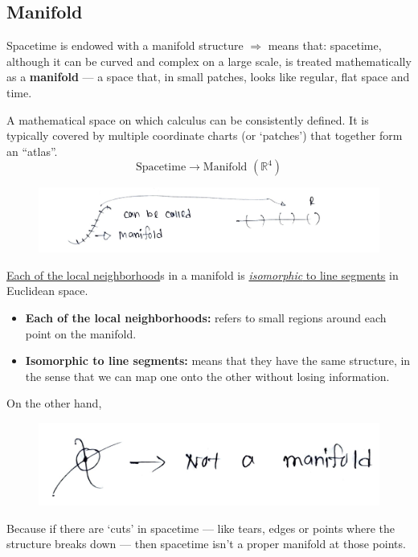 \documentclass[14pt]{article} %
\begin{document}
\subsection{Manifold}
Spacetime is endowed with a manifold structure $\Rightarrow$ means that: spacetime, although it can be curved and complex on a large scale, is treated mathematically as a \textbf{manifold} — a space that, in small patches, looks like regular, flat space and time.
\begin{tcolorbox}[ title=\textbf{Definition}]
A mathematical space on which calculus can be consistently defined. It is typically covered by multiple coordinate charts (or `patches') that together form an ``atlas''.
\[
\text{Spacetime} \rightarrow \text{Manifold } (\mathbb{R}^4)
\]
\end{tcolorbox}
\vspace{-0.5cm}
\begin{figure}[H]
\centering
\includegraphics[width=0.9\linewidth]{L(-1)_1.jpg}
\caption*{}
\end{figure}
\vspace{-0.9cm}
\noindent
\underline{Each of the local neighborhood}s in a manifold is \underline{\textit{isomorphic} to line segments} in Euclidean space.
\begin{itemize}
  \item \textbf{Each of the local neighborhoods:} refers to small regions around each point on the manifold.
  \item \textbf{Isomorphic to line segments:} means that they have the same structure, in the sense that we can map one onto the other without losing information.
\end{itemize}
On the other hand,
\begin{figure}[H]
\centering
\includegraphics[width=0.5\linewidth]{L(-1)_2.jpg}
\caption*{}
\end{figure}
\vspace{-0.9cm}
\noindent
Because if there are `cuts' in spacetime — like tears, edges or points where the structure breaks down — then spacetime isn't a proper manifold at those points.
\end{document}

